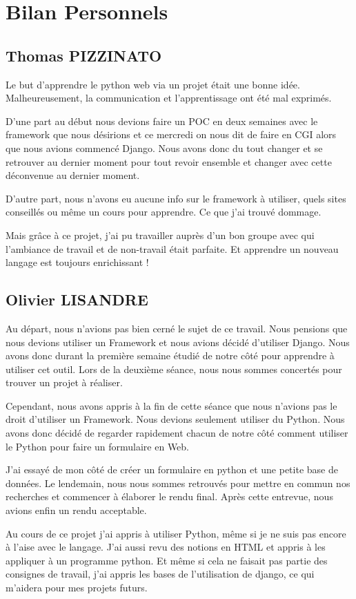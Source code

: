 \documentclass[12pt]{article}
\begin{document}
\section{Bilan Personnels}
\subsection{Thomas PIZZINATO}
Le but d'apprendre le python web via un projet était une bonne idée. Malheureusement, la communication et l'apprentissage ont été mal exprimés. \par
D'une part au début nous devions faire un POC en deux semaines avec le framework que nous désirions et ce mercredi on nous dit de faire en CGI alors que nous avions commencé Django. Nous avons donc du tout changer et se retrouver au dernier moment pour tout revoir ensemble et changer avec cette déconvenue au dernier moment. \par
D'autre part, nous n’avons eu aucune info sur le framework à utiliser, quels sites conseillés ou même un cours pour apprendre. Ce que j'ai trouvé dommage. \par
Mais grâce à ce projet, j'ai pu travailler auprès d'un bon groupe avec qui l'ambiance de travail et de non-travail était parfaite. 
Et apprendre un nouveau langage est toujours enrichissant !
\subsection{Olivier LISANDRE}
Au départ, nous n’avions pas bien cerné le sujet de ce travail. Nous pensions que nous devions utiliser un Framework et nous avions décidé d’utiliser Django. Nous avons donc durant la première semaine étudié de notre côté pour apprendre à utiliser cet outil.  Lors de la deuxième séance, nous nous sommes concertés pour trouver un projet à réaliser. \par
Cependant, nous avons appris à la fin de cette séance que nous n’avions pas le droit d’utiliser un Framework. Nous devions seulement utiliser du Python. Nous avons donc décidé de regarder rapidement chacun de notre côté comment utiliser le Python pour faire un formulaire en Web.\par
J’ai essayé de mon côté de créer un formulaire en python et une petite base de données.
Le lendemain, nous nous sommes retrouvés pour mettre en commun nos recherches et commencer à élaborer le rendu final. Après cette entrevue, nous avions enfin un rendu acceptable. \par
Au cours de ce projet j’ai appris à utiliser Python, même si je ne suis pas encore à l’aise avec le langage. J’ai aussi revu des notions en HTML et appris à les appliquer à un programme python. Et même si cela ne faisait pas partie des consignes de travail, j’ai appris les bases de l’utilisation de django, ce qui m’aidera pour mes projets futurs.
\end{document}
